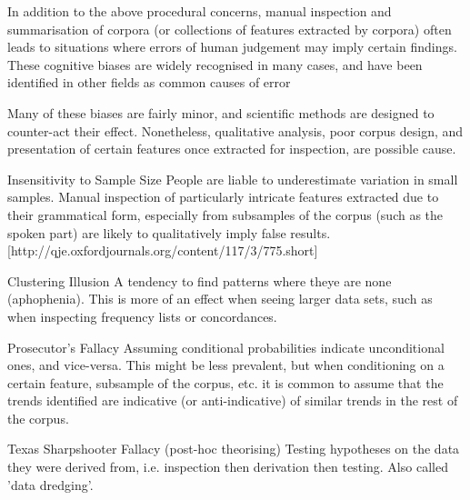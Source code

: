 In addition to the above procedural concerns, manual inspection and summarisation of corpora (or collections of features extracted by corpora) often leads to situations where errors of human judgement may imply certain findings.  These cognitive biases are widely recognised in many cases, and have been identified in other fields as common causes of error 

Many of these biases are fairly minor, and scientific methods are designed to counter-act their effect.  Nonetheless, qualitative analysis, poor corpus design, and presentation of certain features once extracted for inspection, are possible cause.  


\begin{itemizeTitle}
    \item[Insensitivity to Sample Size] People are liable to underestimate variation in small samples.  Manual inspection of particularly intricate features extracted due to their grammatical form, especially from subsamples of the corpus (such as the spoken part) are likely to qualitatively imply false results. [http://qje.oxfordjournals.org/content/117/3/775.short]
    \item[Clustering Illusion] A tendency to find patterns where theye are none (aphophenia).  This is more of an effect when seeing larger data sets, such as when inspecting frequency lists or concordances.
    \item[Prosecutor's Fallacy] Assuming conditional probabilities indicate unconditional ones, and vice-versa.  This might be less prevalent, but when conditioning on a certain feature, subsample of the corpus, etc. it is common to assume that the trends identified are indicative (or anti-indicative) of similar trends in the rest of the corpus.
    \item[Texas Sharpshooter Fallacy (post-hoc theorising)] Testing hypotheses on the data they were derived from, i.e. inspection then derivation then testing.  Also called 'data dredging'.
\end{itemizeTitle}



